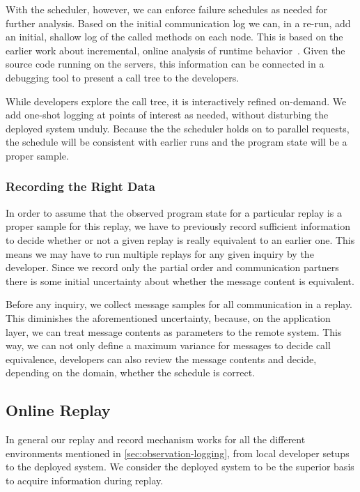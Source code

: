 With the scheduler, however, we can enforce failure schedules as
needed for further analysis. Based on the initial communication log we
can, in a re-run, add an initial, shallow log of the called methods on
each node. This is based on the earlier work about incremental, online
analysis of runtime behavior~\cite{Perscheid2010}. Given the source
code running on the servers, this information can be connected in a
debugging tool to present a call tree to the developers.

While developers explore the call tree, it is interactively refined
on-demand. We add one-shot logging at points of interest as needed,
without disturbing the deployed system unduly. Because the the
scheduler holds on to parallel requests, the schedule will be
consistent with earlier runs and the program state will be a proper
sample.

\subsubsection{Recording the Right Data}
\label{sec:record-right-amount}

In order to assume that the observed program state for a particular
replay is a proper sample for this replay, we have to previously
record sufficient information to decide whether or not a given replay
is really equivalent to an earlier one. This means we may have to run
multiple replays for any given inquiry by the developer. Since we
record only the partial order and communication partners there is some
initial uncertainty about whether the message content is
equivalent.

Before any inquiry, we collect message samples for all communication
in a replay. This diminishes the aforementioned uncertainty, because,
on the application layer, we can treat message contents as parameters
to the remote system. This way, we can not only define a maximum
variance for messages to decide call equivalence, developers can also
review the message contents and decide, depending on the domain,
whether the schedule is correct.

\subsection{Online Replay}
\label{sec:online-replay}

In general our replay and record mechanism works for all the different
environments mentioned in \autoref{sec:observation-logging}, from
local developer setups to the deployed system. We consider the
deployed system to be the superior basis to acquire information during
replay.

